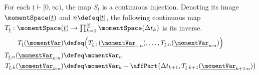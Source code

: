 \begin{lemma}
  \label{lemma:S-injection}
  For each $\underline t \vdash [0,\infty)$, the map $S_{\underline t}$ is a continuous injection.
  Denoting its image $\momentSpace(\underline t)$ and $n\defeq |\underline t|$, the following continuous map $T_{\underline t}: \momentSpace(\underline t) \rightarrow \prod_{k=1}^{|\underline t|} \momentSpace(\Delta t_k)$ is its inverse.
  \begin{align}
    T_{\underline t}(\underline\momentVar) &\defeq \Big( T_{\underline t,1}(\underline\momentVar_{1:n}), \ldots, T_{\underline t,n}(\underline\momentVar_{n:n})\Big) \\
    T_{\underline t,n}(\underline\momentVar_{n:n}) &\defeq \momentVar_n \\
    T_{\underline t,k}(\underline\momentVar_{k:n}) &\defeq \momentVar_k + \affPart\big(\Delta t_{k+1}, T_{\underline t, k+1}(\underline\momentVar_{k+1:n})\big)
  \end{align}
\end{lemma}
